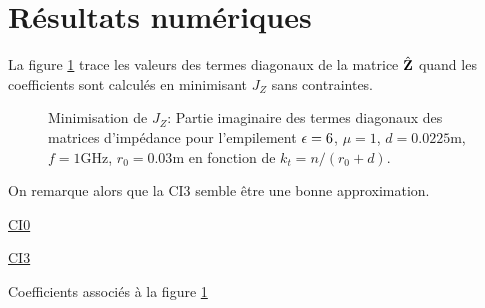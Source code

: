 \section{Résultats numériques}

  La figure \ref{fig:imp_fourier:sphere:hoppe:62:hoibc:mode_2} trace les valeurs des termes diagonaux de la matrice \(\hat{\mathbf{Z}}\) quand les coefficients sont calculés en minimisant \(J_Z\) sans contraintes.
  \begin{figure}[!hbt]
    \centering
    
    \caption[Partie imaginaire de l'opérateur de Calderón, compararé avec les approximations CI0, CI3, CI6 (calculées avec Jz) pour une couche sphérique de matériau de Hoppe \& Rahmat-Samii.]{Minimisation de \(J_Z\): Partie imaginaire des termes diagonaux des matrices d'impédance pour l'empilement \(\epsilon = 6\), \(\mu = 1\), \(d=0.0225\)m, \(f=1\)GHz, \(r_0=0.03\)m en fonction de \(k_t = n / (r_0+d)\).}
    \label{fig:imp_fourier:sphere:hoppe:62:hoibc:mode_2}
  \end{figure}
  On remarque alors que la CI3 semble être une bonne approximation. 

  \begin{table}[!hbt]
    \centering
    \begin{minipage}[t]{0.49\textwidth}
      \vspace{0pt}
      \centering
      \begin{coefftable}{\hyperlink{ci0}{CI0}}
        
      \end{coefftable}
    \end{minipage}
    \begin{minipage}[t]{0.49\textwidth}
      \vspace{0pt}
      \centering
      \begin{coefftable}{\hyperlink{ci3}{CI3}}
        
      \end{coefftable}
    \end{minipage}
    \caption{Coefficients associés à la figure \ref{fig:imp_fourier:sphere:hoppe:62:hoibc:mode_2}}
    \label{tab:imp_fourier:sphere:hoppe:62:hoibc:mode_2}
  \end{table}


